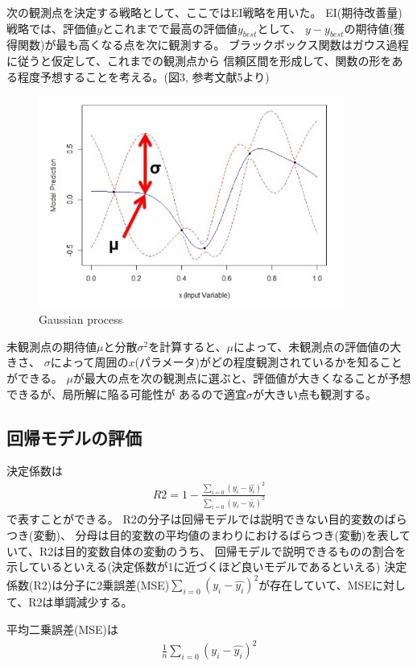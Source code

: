 \documentclass{jsarticle}
\begin{document}
次の観測点を決定する戦略として、ここではEI戦略を用いた。
EI(期待改善量)戦略では、評価値$y$とこれまでで最高の評価値$y_{best}$として、
$y - y_{best}$の期待値(獲得関数)が最も高くなる点を次に観測する。
ブラックボックス関数はガウス過程に従うと仮定して、これまでの観測点から
信頼区間を形成して、関数の形をある程度予想することを考える。(図3, 参考文献5より)
\begin{figure}[H]
\centering
\includegraphics[width=10cm]{gauss.jpg}
\caption{Gaussian process}
\end{figure}
未観測点の期待値$\mu$と分散$\sigma^2$を計算すると、$\mu$によって、未観測点の評価値の大きさ、
$\sigma$によって周囲の$x$(パラメータ)がどの程度観測されているかを知ることができる。
$\mu$が最大の点を次の観測点に選ぶと、評価値が大きくなることが予想できるが、局所解に陥る可能性が
あるので適宜$\sigma$が大きい点も観測する。

\subsection{回帰モデルの評価}
決定係数は
\begin{eqnarray}
R2 = 1 - \frac{\sum_{i=0} (y_i - \hat{y_i})^2}{\sum_{i=0} (y_i - \bar{y_i})^2}
\end{eqnarray}
で表すことができる。
R2の分子は回帰モデルでは説明できない目的変数のばらつき(変動)、
分母は目的変数の平均値のまわりにおけるばらつき(変動)を表していて、R2は目的変数自体の変動のうち、
回帰モデルで説明できるものの割合を示しているといえる(決定係数が1に近づくほど良いモデルであるといえる)
決定係数(R2)は分子に2乗誤差(MSE)$\sum_{i=0} (y_i - \hat{y_i})^2$が存在していて、MSEに対して、R2は単調減少する。

平均二乗誤差(MSE)は
\begin{eqnarray*}
    \frac{1}{n} \sum_{i=0} (y_i - \hat{y_i})^2
\end{eqnarray*}
\end{document}
